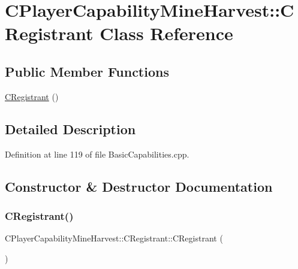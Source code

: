\hypertarget{classCPlayerCapabilityMineHarvest_1_1CRegistrant}{}\section{C\+Player\+Capability\+Mine\+Harvest\+:\+:C\+Registrant Class Reference}
\label{classCPlayerCapabilityMineHarvest_1_1CRegistrant}
\subsection*{Public Member Functions}
\begin{DoxyCompactItemize}
\item 
\hyperlink{classCPlayerCapabilityMineHarvest_1_1CRegistrant_a5d672b383de5f1539b5ca0cc9f18674d}{C\+Registrant} ()
\end{DoxyCompactItemize}


\subsection{Detailed Description}


Definition at line 119 of file Basic\+Capabilities.\+cpp.



\subsection{Constructor \& Destructor Documentation}
\hypertarget{classCPlayerCapabilityMineHarvest_1_1CRegistrant_a5d672b383de5f1539b5ca0cc9f18674d}{}\label{classCPlayerCapabilityMineHarvest_1_1CRegistrant_a5d672b383de5f1539b5ca0cc9f18674d} 
\subsubsection{\texorpdfstring{C\+Registrant()}{CRegistrant()}}
{\footnotesize\ttfamily C\+Player\+Capability\+Mine\+Harvest\+::\+C\+Registrant\+::\+C\+Registrant (\begin{DoxyParamCaption}{ }\end{DoxyParamCaption})}



